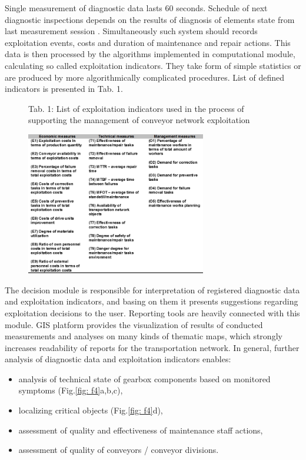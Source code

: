 Single measurement of diagnostic data lasts 60 seconds. Schedule of next diagnostic inspections depends on the results of diagnosis of elements state from last measurement session \cite{Stefaniak2014,Stefaniak2016}. 
Simultaneously such system should records exploitation events, costs and duration of maintenance and repair actions. This data is then processed by the algorithms implemented in computational module, calculating so called exploitation indicators. They take form of simple statistics or are produced by more algorithmically complicated procedures. List of defined indicators is presented in Tab. 1.
\begin{figure}[ht!]
\begin{flushleft}{\normalsize Tab. 1: List of exploitation indicators used in the process of supporting the management of conveyor network exploitation}\end{flushleft}
\centering
\includegraphics[width = 0.7\textwidth]{Wykresy/tab2.png}
\label{tab: t1}
\end{figure} \par
The decision module is responsible for interpretation of registered diagnostic data and exploitation indicators, and basing on them it presents suggestions regarding exploitation decisions to the user. Reporting tools are heavily connected with this module. GIS platform provides the visualization of results of conducted measurements and analyses on many kinds of thematic maps, which strongly increases readability of reports for the transportation network. 
In general, further analysis of diagnostic data and exploitation indicators enables:
\begin{itemize}
\renewcommand{\labelitemi}{$\bullet$}
\item analysis of technical state of gearbox components based on monitored symptoms (Fig.\ref{fig: f4}a,b,c),
\item localizing critical objects (Fig.\ref{fig: f4}d),
\item assessment of quality and effectiveness of maintenance staff actions,
\item assessment of quality of conveyors / conveyor divisions.
\end{itemize}
